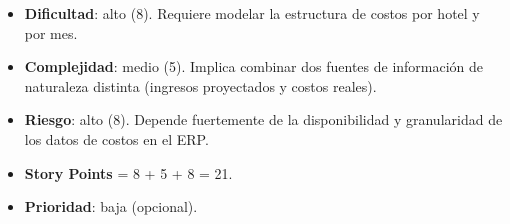 \documentclass[
11pt, %
]{charter}
\begin{document}
\begin{itemize}
    \begin{itemize}
      \item \textbf{Dificultad}: alto (8). Requiere modelar la estructura de costos por hotel y por mes.
      \item \textbf{Complejidad}: medio (5). Implica combinar dos fuentes de información de naturaleza distinta (ingresos proyectados y costos reales).
      \item \textbf{Riesgo}: alto (8). Depende fuertemente de la disponibilidad y granularidad de los datos de costos en el ERP.
      \item \textbf{Story Points} = 8 + 5 + 8 = 21.
      \item \textbf{Prioridad}: baja (opcional).
    \end{itemize}
\end{itemize}
\end{document}
